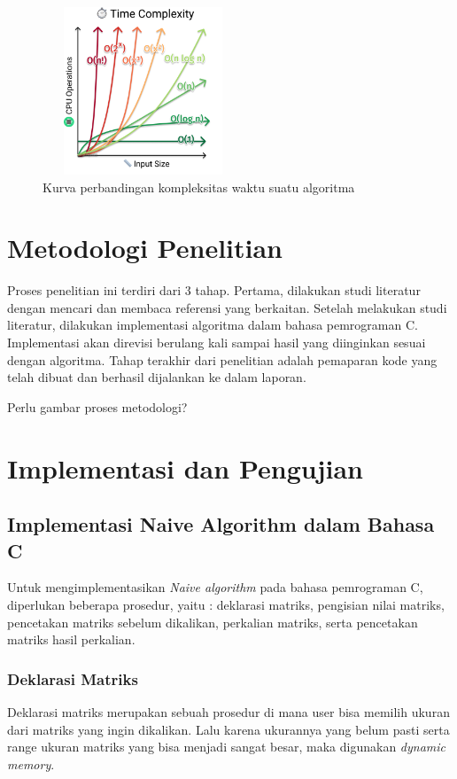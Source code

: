 \documentclass[conference]{IEEEtran}
\begin{document}
\begin{figure}[h]
   \includegraphics[width = 6cm, height = 5cm]{Kurva_Kompleksitas_Waktu.png}
   \centering
   \caption{Kurva perbandingan kompleksitas waktu suatu algoritma}
\end{figure}

\section{Metodologi Penelitian}
Proses penelitian ini terdiri dari 3 tahap.
Pertama, dilakukan studi literatur dengan mencari dan membaca referensi yang berkaitan.
Setelah melakukan studi literatur, dilakukan implementasi algoritma dalam bahasa pemrograman C.
Implementasi akan direvisi berulang kali sampai hasil yang diinginkan sesuai dengan algoritma.
Tahap terakhir dari penelitian adalah pemaparan kode yang telah dibuat dan berhasil dijalankan ke dalam laporan.

Perlu gambar proses metodologi?

\section{Implementasi dan Pengujian}

\subsection{Implementasi Naive Algorithm dalam Bahasa C}
Untuk mengimplementasikan \textit{Naive algorithm} pada bahasa pemrograman C, diperlukan beberapa prosedur, yaitu : 
deklarasi matriks, pengisian nilai matriks, pencetakan matriks sebelum dikalikan, perkalian matriks, serta pencetakan matriks hasil perkalian. 

\subsubsection{Deklarasi Matriks}
Deklarasi matriks merupakan sebuah prosedur di mana user bisa memilih ukuran dari matriks yang ingin dikalikan. 
Lalu karena ukurannya yang belum pasti serta range ukuran matriks yang bisa menjadi sangat besar, maka digunakan \textit{dynamic memory}.
\end{document}
